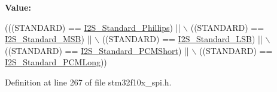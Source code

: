 {\bfseries Value\+:}
\begin{DoxyCode}
(((STANDARD) == \hyperlink{group___i2_s___standard_gacdb89d66a2a941924ff4b7a8d14884f9}{I2S\_Standard\_Phillips}) || \(\backslash\)
                                   ((STANDARD) == \hyperlink{group___i2_s___standard_gae716cfa7e031affc37fe65dd80b0e6f4}{I2S\_Standard\_MSB}) || \(\backslash\)
                                   ((STANDARD) == \hyperlink{group___i2_s___standard_ga88bc9001a13b95a0844d81fea2080df6}{I2S\_Standard\_LSB}) || \(\backslash\)
                                   ((STANDARD) == \hyperlink{group___i2_s___standard_gaaf59e587048ff632037dfc9875ab4c7b}{I2S\_Standard\_PCMShort}) || \(\backslash\)
                                   ((STANDARD) == \hyperlink{group___i2_s___standard_gaf79cb88702059506d876dbd776d7a136}{I2S\_Standard\_PCMLong}))
\end{DoxyCode}


Definition at line 267 of file stm32f10x\+\_\+spi.\+h.

